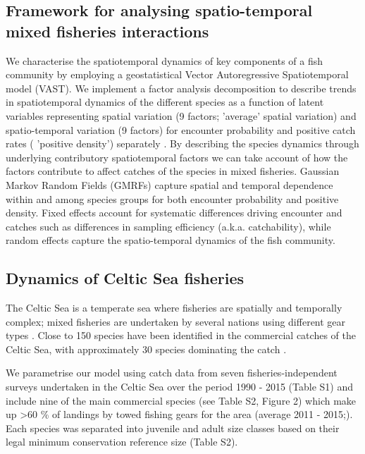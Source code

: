\documentclass{nature}
\begin{document}
\begin{linenumbers}
\subsection{Framework for analysing spatio-temporal mixed fisheries
	interactions}

 We  characterise
the spatiotemporal dynamics of key components of a fish community by employing
a geostatistical Vector Autoregressive Spatiotemporal model (VAST). We
implement a factor analysis decomposition to describe trends in spatiotemporal
dynamics of the different species as a function of latent variables
\cite{Thorson2015} representing spatial variation (9 factors;  'average' spatial variation) and spatio-temporal variation (9
factors) for encounter probability and positive catch rates ( 'positive density') separately \cite{Thorson2015a}. By
describing the species dynamics through underlying contributory
spatiotemporal factors we can take account of how the factors contribute to
affect catches of the species in mixed fisheries.  Gaussian
Markov Random Fields (GMRFs)  capture spatial and temporal dependence
within and among species groups for both encounter probability and positive
density\cite{Thorson2013}.  Fixed effects  account for systematic differences driving
encounter and catches such as differences in sampling efficiency (a.k.a.
catchability), while random effects capture the spatio-temporal dynamics of the
fish community.

\subsection{Dynamics of Celtic Sea fisheries}


The Celtic Sea is a temperate sea where fisheries are spatially and temporally
complex; mixed fisheries are undertaken by several nations using different gear
types \cite{Ellis2000, Gerritsen2012}. Close to 150 species have been
identified in the commercial catches of the Celtic Sea, with approximately 30
species dominating the catch \cite{Mateo2016}.

We parametrise our  model using catch data from seven
fisheries-independent surveys undertaken in the Celtic Sea over the period 1990
- 2015 (Table S1) and include nine of the main commercial species (see Table
S2, Figure 2)  which make up \textgreater 60 \% of landings by towed fishing gears for the
area (average 2011 - 2015;\cite{STECF2017}). Each species was separated into
juvenile and adult size classes based on their legal minimum conservation
reference size (Table S2).




\end{linenumbers}
\end{document}
